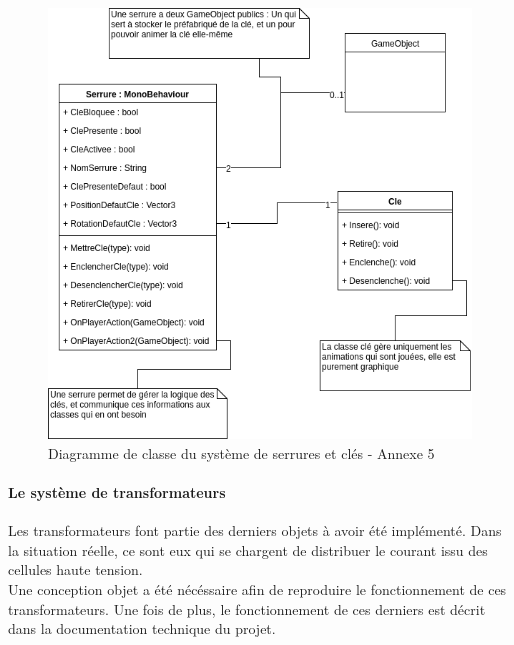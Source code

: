 \documentclass[a4paper]{article}
\begin{document}
    \begin{figure}[H]
        \centering
        \includegraphics[scale=0.5]{img/DiagClasseSerrures}
        \caption{Diagramme de classe du système de serrures et clés - Annexe 5}
    \end{figure}

    \paragraph{Le système de transformateurs}

    Les transformateurs font partie des derniers objets à avoir été implémenté. Dans la situation réelle, ce sont eux qui se chargent de distribuer le courant issu des cellules haute tension. \\

    Une conception objet a été nécéssaire afin de reproduire le fonctionnement de ces transformateurs. Une fois de plus, le fonctionnement de ces derniers est décrit dans la documentation technique du projet. \\
\end{document}
